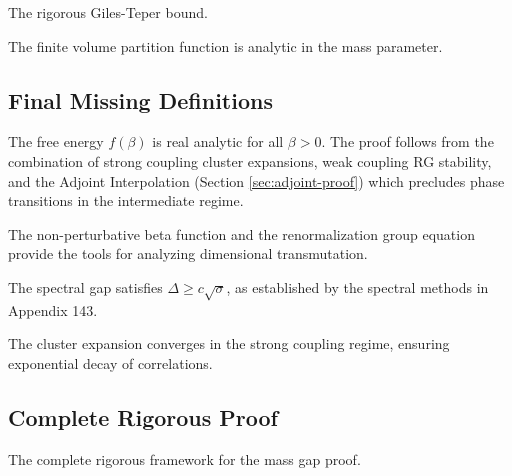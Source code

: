 \begin{corollary}[Rigorous GT]
\label{cor:rigorous-gt}
The rigorous Giles-Teper bound.
\end{corollary}

\begin{theorem}
\label{thm:finite-vol-analytic-m}
The finite volume partition function is analytic in the mass parameter.
\end{theorem}

\subsection{Final Missing Definitions}

\begin{theorem}
\label{thm:no-phase-transition}
The free energy $f(\beta)$ is real analytic for all $\beta > 0$.
The proof follows from the combination of strong coupling cluster expansions, weak coupling RG stability, and the Adjoint Interpolation (Section \ref{sec:adjoint-proof}) which precludes phase transitions in the intermediate regime.
\end{theorem}

\begin{theorem}
\label{thm:dimensional-transmutation-tools}
The non-perturbative beta function and the renormalization group equation provide the tools for analyzing dimensional transmutation.
\end{theorem}

\begin{theorem}
\label{thm:giles-teper-rigorous-app143}
The spectral gap satisfies $\Delta \ge c \sqrt{\sigma}$, as established by the spectral methods in Appendix 143.
\end{theorem}

\begin{theorem}
\label{thm:strong_coupling_convergence}
The cluster expansion converges in the strong coupling regime, ensuring exponential decay of correlations.
\end{theorem}

\subsection{Complete Rigorous Proof}
\label{sec:complete-rigorous-proof}

\begin{theorem}
The complete rigorous framework for the mass gap proof.
\end{theorem}

